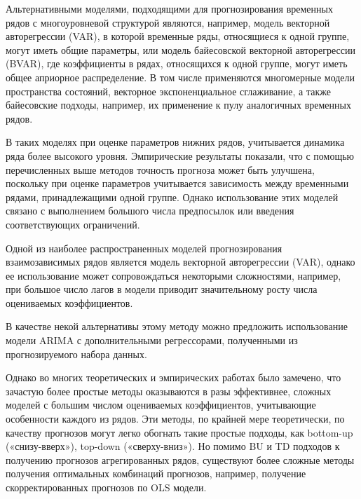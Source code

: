 \documentclass[12pt,a4paper, oneside]{extreport}
\begin{document}
Альтернативными моделями, подходящими для прогнозирования  временных рядов с многоуровневой  структурой являются, например, модель  векторной авторегрессии (VAR), в которой  временные ряды, относящиеся к одной группе, могут  иметь общие параметры,  или модель байесовской векторной авторегрессии (BVAR), где коэффициенты в рядах, относящихся к одной группе, могут иметь общее априорное распределение.  В том числе применяются многомерные модели пространства состояний, векторное  экспоненциальное сглаживание, а также  байесовские подходы, например, их применение к пулу аналогичных временных рядов\cite{duncan2001forecasting}.

В таких моделях при оценке  параметров нижних рядов, учитывается динамика    ряда более высокого уровня. 
Эмпирические результаты показали, что с помощью перечисленных выше методов точность прогноза может быть улучшена, поскольку при оценке параметров учитывается    зависимость  между временными рядами, принадлежащими одной группе. Однако использование этих моделей связано с выполнением большого числа предпосылок или введения соответствующих ограничений.

Одной из наиболее распространенных моделей прогнозирования взаимозависимых рядов является модель векторной авторегрессии (VAR), однако ее использование может сопровождаться некоторыми сложностями, например, при большое число лагов в модели приводит значительному росту числа оцениваемых коэффициентов.  

В качестве некой альтернативы этому методу можно предложить использование модели ARIMA с дополнительными регрессорами, полученными из прогнозируемого набора данных. 



Однако во многих теоретических и эмпирических работах было замечено, что зачастую более простые методы  оказываются в разы эффективнее, сложных моделей с большим числом оцениваемых  коэффициентов, учитывающие особенности каждого из рядов. 
Эти методы, по крайней мере теоретически, по качеству прогнозов могут легко обогнать  такие простые подходы, как bottom-up («снизу-вверх»), top-down («сверху-вниз»).
Но помимо BU и TD подходов к получению прогнозов агрегированных рядов, существуют более сложные методы получения  оптимальных комбинаций прогнозов, например, получение скорректированных прогнозов по OLS модели.
\end{document}
